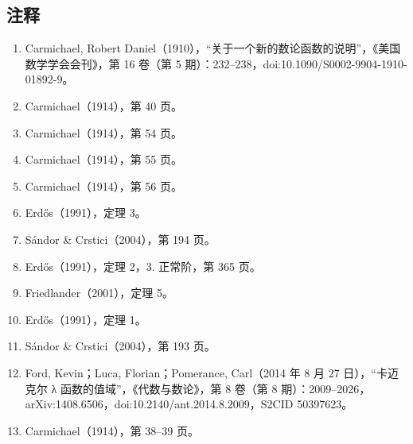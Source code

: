 \subsection{注释}
\begin{enumerate}
\item Carmichael, Robert Daniel（1910），“关于一个新的数论函数的说明”，《美国数学学会会刊》，第 16 卷（第 5 期）：232–238，doi:10.1090/S0002-9904-1910-01892-9。
\item Carmichael（1914），第 40 页。
\item Carmichael（1914），第 54 页。
\item Carmichael（1914），第 55 页。
\item Carmichael（1914），第 56 页。
\item Erdős（1991），定理 3。
\item Sándor & Crstici（2004），第 194 页。
\item Erdős（1991），定理 2，3. 正常阶，第 365 页。
\item Friedlander（2001），定理 5。
\item Erdős（1991），定理 1。
\item Sándor & Crstici（2004），第 193 页。
\item Ford, Kevin；Luca, Florian；Pomerance, Carl（2014 年 8 月 27 日），“卡迈克尔 λ 函数的值域”，《代数与数论》，第 8 卷（第 8 期）：2009–2026，arXiv:1408.6506，doi:10.2140/ant.2014.8.2009，S2CID 50397623。
\item Carmichael（1914），第 38–39 页。
\end{enumerate}